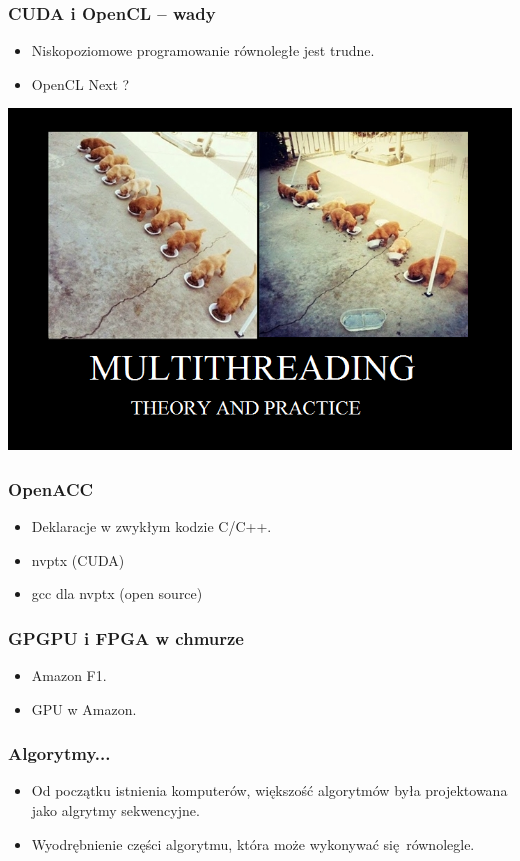 \documentclass[dvipsnames,table]{beamer}
\begin{document}
\begin{frame}
	\frametitle{CUDA i OpenCL -- wady}
\begin{itemize}

	\item Niskopoziomowe programowanie równoległe jest trudne.
	\item OpenCL Next ?
\end{itemize}
\includegraphics[scale=0.25]{img-threadpuppies.png}
\end{frame}


\begin{frame}
	\frametitle{OpenACC}
\begin{itemize}
	\item Deklaracje w zwykłym kodzie C/C++.
	\item nvptx (CUDA)
	\item gcc dla nvptx (open source)
\end{itemize}
\end{frame}

\begin{frame}
	\frametitle{GPGPU i FPGA w chmurze}
\begin{itemize}
	\item Amazon F1.
	\item GPU w Amazon.
\end{itemize}
\end{frame}

\begin{frame}
	\frametitle{Algorytmy...}
\begin{itemize}
	\item Od początku istnienia komputerów, większość algorytmów była projektowana jako algrytmy sekwencyjne.
	\item Wyodrębnienie części algorytmu, która może wykonywać się równolegle.
\end{itemize}
\end{frame}
\end{document}
